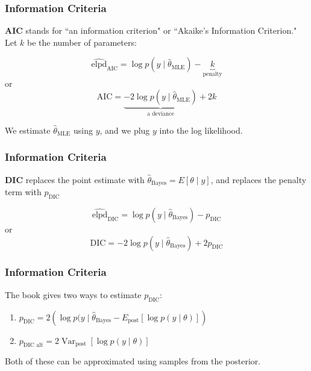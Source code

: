 \documentclass{beamer}
\begin{document}
\begin{frame}
\frametitle{Information Criteria}

{\bf AIC} stands for ``an information criterion" or ``Akaike's Information Criterion." Let $k$ be the number of parameters:
\newline

\[
\widehat{\text{elpd}}_{\text{AIC}} = \log p(y \mid \hat{\theta}_{\text{MLE}}) - \underbrace{k}_{\text{penalty}}
\]
or
\[
\text{AIC} = \underbrace{-2\log p(y \mid \hat{\theta}_{\text{MLE}})}_{\text{a deviance}} +2 k
\]

We estimate $\hat{\theta}_{\text{MLE}}$ using $y$, \*and\* we plug $y$ into the log likelihood. 

\end{frame}


\begin{frame}
\frametitle{Information Criteria}

{\bf DIC} replaces the point estimate with $\hat{\theta}_{\text{Bayes}} = E[\theta \mid y]$, and replaces the penalty term with $p_{\text{DIC}}$
\newline

\[
\widehat{\text{elpd}}_{\text{DIC}} = \log p(y \mid \hat{\theta}_{\text{Bayes}}) - p_{\text{DIC}}
\]
or
\[
\text{DIC} = -2\log p(y \mid \hat{\theta}_{\text{Bayes}}) +2 p_{\text{DIC}}
\]

\end{frame}

\begin{frame}
\frametitle{Information Criteria}

The book gives two ways to estimate $p_{\text{DIC}}$:

\begin{enumerate}
\item $p_{\text{DIC}} = 2\left(\log p(y \mid \hat{\theta}_{\text{Bayes}} - E_{\text{post}}\left[ \log p(y \mid \theta) \right] \right)$
\item $p_{\text{DIC alt}} = 2 \operatorname{Var}_{\text{post}}\left[ \log p(y \mid \theta) \right]$
\end{enumerate}

Both of these can be approximated using samples from the posterior.

\end{frame}
\end{document}
